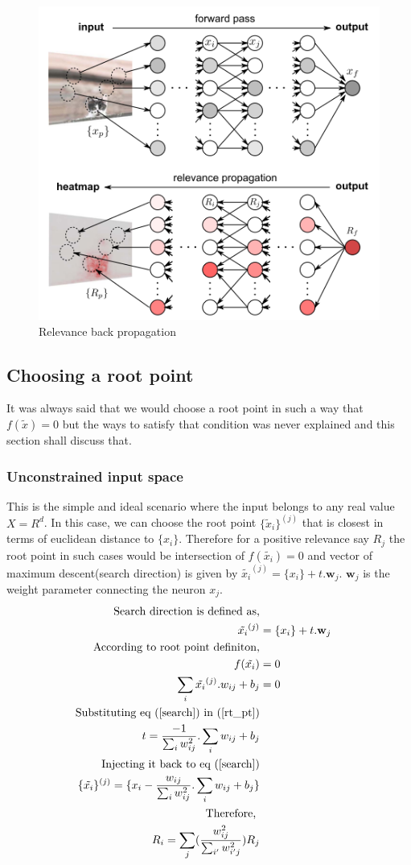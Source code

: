 \documentclass{article}
\begin{document}
	\begin{figure}[H]
		\centering
		\includegraphics[width=0.65\linewidth]{relevance_bp}
		\caption{Relevance back propagation}
		\label{fig:relevance_bp}
	\end{figure}
	
	\subsection{Choosing a root point}
	It was always said that we would choose a root point in such a way that $f(\tilde{x}) = 0$ but the ways to satisfy that condition was never explained and this section shall discuss that.
	\subsubsection{Unconstrained input space}
	This is the simple and ideal scenario where the input belongs to any real value $X = R^d$. In this case, we can choose the root point $\{ \tilde{x}_i\}^{(j)}$ that is closest in terms of euclidean distance to $\{x_i\}$. Therefore for a positive relevance say $R_j$ the root point in such cases would be intersection of $f(\tilde{x_i}) = 0$ and vector of maximum descent(search direction) is given by $\tilde{x_i}^{(j)} = \{x_i\} + t.\textbf{w}_j$. $\textbf{w}_j$ is the weight parameter connecting the neuron $x_j$.
	\begin{align}
	    \text{Search direction is defined as,} \nonumber \\ \label{search}
		\tilde{x_i}^{(j)} &= \{x_i\} + t.\textbf{w}_j  \\
		\text{According to root point definiton,} & \nonumber \\
		f(\tilde{x_i}) &= 0   \nonumber \\
		\sum_{i} \tilde{x_i}^{(j)}.w_{ij} + b_j &= 0  \label{rt_pt} \\
		\text{Substituting eq (\ref{search}) in  (\ref{rt_pt})} & \nonumber \\
		t = \frac{-1}{\sum_{i} w_{ij}^{2}} . \sum_{i} w_{ij} +b_{j} \nonumber \\
		\text{Injecting it back to eq (\ref{search})} \nonumber \\
		\{\tilde{x_i} \}^{(j)} = \{x_i -  \frac{w_{ij}}{\sum_{i} w_{ij}^{2}} . \sum_{i} w_{ij} +b_{j}  \}  \\
		\text{Therefore, }& \nonumber \\
		R_i = \sum_j (\frac{w_{ij}^{2}}{\sum_{i'} w_{i'j}^2}) R_j 		
	\end{align}
\end{document}
